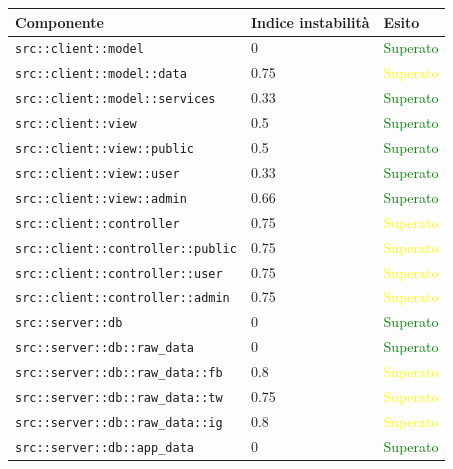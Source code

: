 		\begin{center}

			\def\arraystretch{1.5}
			\bgroup
			\begin{longtable}{| p{8.5cm} | p{3.5cm} | p{3cm} |}
					\hline
					\textbf{Componente} & \textbf{Indice instabilità} & \textbf{Esito}\\
					\hline
					\texttt{src::client::model} & 0 & \textcolor{green}{Superato}\\
					\hline
					\texttt{src::client::model::data} & 0.75 & \textcolor{yellow}{Superato}\\
					\hline
					\texttt{src::client::model::services} & 0.33 & \textcolor{green}{Superato}\\
					\hline
					\texttt{src::client::view} & 0.5 & \textcolor{green}{Superato}\\ 
					\hline
					\texttt{src::client::view::public} & 0.5 & \textcolor{green}{Superato}\\
					\hline
					\texttt{src::client::view::user} & 0.33 & \textcolor{green}{Superato}\\
					\hline
					\texttt{src::client::view::admin} & 0.66 & \textcolor{green}{Superato}\\
					\hline
					\texttt{src::client::controller} &  0.75 & \textcolor{yellow}{Superato}\\
					\hline
					\texttt{src::client::controller::public} & 0.75 & \textcolor{yellow}{Superato}\\
					\hline
					\texttt{src::client::controller::user} & 0.75 & \textcolor{yellow}{Superato}\\
					\hline
					\texttt{src::client::controller::admin} & 0.75 & \textcolor{yellow}{Superato}\\
					\hline
					\texttt{src::server::db} & 0 & \textcolor{green}{Superato}\\
					\hline
					\texttt{src::server::db::raw\_data} & 0 & \textcolor{green}{Superato}\\ 
					\hline
					\texttt{src::server::db::raw\_data::fb} & 0.8 & \textcolor{yellow}{Superato}\\
					\hline
					\texttt{src::server::db::raw\_data::tw} & 0.75 & \textcolor{yellow}{Superato}\\
					\hline
					\texttt{src::server::db::raw\_data::ig} & 0.8 & \textcolor{yellow}{Superato}\\
					\hline
					\texttt{src::server::db::app\_data} & 0 & \textcolor{green}{Superato}\\

\end{longtable}
\end{center}
